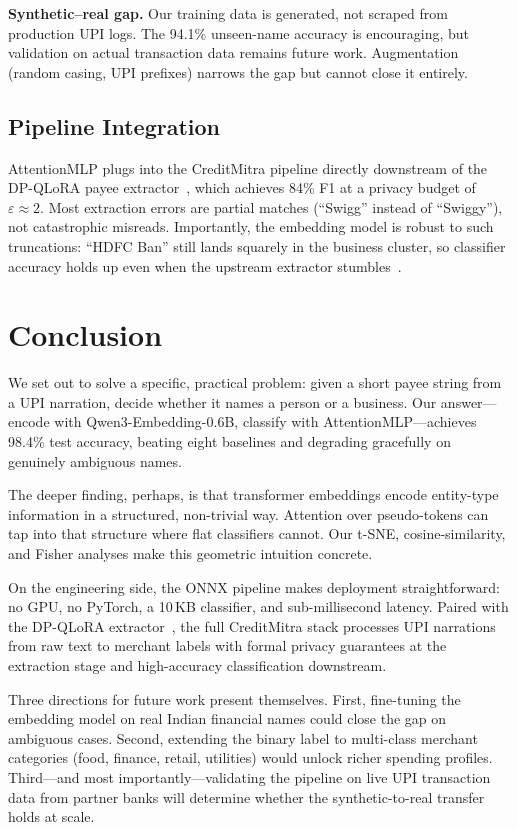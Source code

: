 \documentclass[conference]{IEEEtran}
\begin{document}
\textbf{Synthetic--real gap.} Our training data is generated, not scraped from production UPI logs. The 94.1\% unseen-name accuracy is encouraging, but validation on actual transaction data remains future work. Augmentation (random casing, UPI prefixes) narrows the gap but cannot close it entirely.

\subsection{Pipeline Integration}

AttentionMLP plugs into the CreditMitra pipeline directly downstream of the DP-QLoRA payee extractor~\cite{dpqlora_paper}, which achieves 84\% F1 at a privacy budget of $\varepsilon \approx 2$. Most extraction errors are partial matches (``Swigg'' instead of ``Swiggy''), not catastrophic misreads. Importantly, the embedding model is robust to such truncations: ``HDFC Ban'' still lands squarely in the business cluster, so classifier accuracy holds up even when the upstream extractor stumbles~\cite{reimers2019sentence}.

\section{Conclusion}
\label{sec:conclusion}

We set out to solve a specific, practical problem: given a short payee string from a UPI narration, decide whether it names a person or a business. Our answer---encode with Qwen3-Embedding-0.6B, classify with AttentionMLP---achieves 98.4\% test accuracy, beating eight baselines and degrading gracefully on genuinely ambiguous names.

The deeper finding, perhaps, is that transformer embeddings encode entity-type information in a structured, non-trivial way. Attention over pseudo-tokens can tap into that structure where flat classifiers cannot. Our t-SNE, cosine-similarity, and Fisher analyses make this geometric intuition concrete.

On the engineering side, the ONNX pipeline makes deployment straightforward: no GPU, no PyTorch, a 10\,KB classifier, and sub-millisecond latency. Paired with the DP-QLoRA extractor~\cite{dpqlora_paper}, the full CreditMitra stack processes UPI narrations from raw text to merchant labels with formal privacy guarantees at the extraction stage and high-accuracy classification downstream.

Three directions for future work present themselves. First, fine-tuning the embedding model on real Indian financial names could close the gap on ambiguous cases. Second, extending the binary label to multi-class merchant categories (food, finance, retail, utilities) would unlock richer spending profiles. Third---and most importantly---validating the pipeline on live UPI transaction data from partner banks will determine whether the synthetic-to-real transfer holds at scale.
\end{document}
